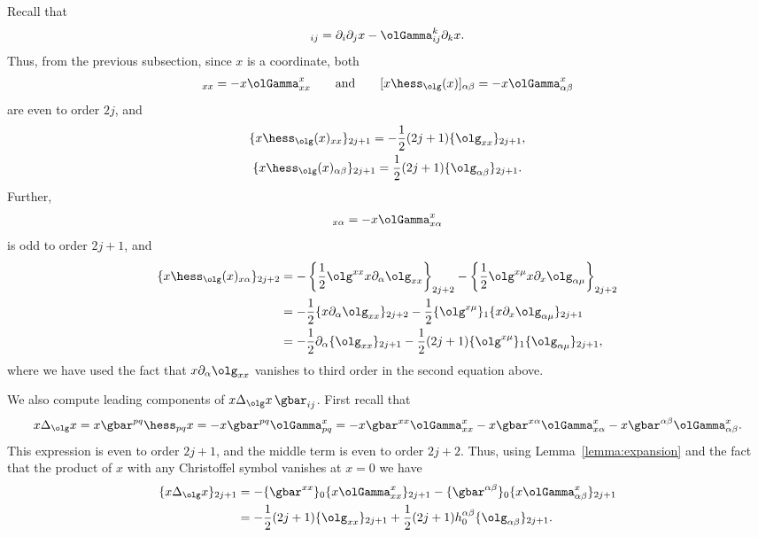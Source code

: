 Recall that
\begin{gather*}
 [\hess_{\olg} x]_{ij} = \partial_i \partial_j x - \olGamma_{ij}^k \partial_k x. \end{gather*}
Thus, from the previous subsection, since $x$ is a coordinate, both
\begin{gather*} [x \hess_{\olg}(x)]_{xx} = - x \olGamma_{xx}^x \qquad \mbox{and} \qquad [x \hess_{\olg}(x)]_{\alpha \beta} = - x \olGamma_{\alpha \beta}^x
\end{gather*}
are even to order $2j$, and
\begin{gather} \label{eqn:hess-asymp-xx}
\{x \hess_{\olg}(x)_{xx}\}_{2j+1} = -\frac{1}{2} (2j+1) \{\olg_{xx}\}_{2j+1}, \\
\{x \hess_{\olg}(x)_{\alpha \beta}\}_{2j+1} = \frac{1}{2} (2j+1) \{\olg_{\alpha \beta}\}_{2j+1}.\label{eqn:hess-asymp-ab}
\end{gather}
Further,
\begin{gather*}
 [x \hess_{\olg}(x)]_{x\alpha} = -x \olGamma_{x\alpha}^x
\end{gather*}
is odd to order $2j+1$, and
\begin{align}
 \{x \hess_{\olg}(x)_{x\alpha}\}_{2j+2} &= -\left\{\frac{1}{2}\olg^{xx} x \partial_{\alpha} \olg_{xx}\right\}_{2j+2} - \left\{ \frac{1}{2} \olg^{x\mu} x \partial_x \olg_{\alpha \mu} \right\}_{2j+2} \nonumber \\
 &= -\frac{1}{2} \{ x \partial_{\alpha} \olg_{xx} \}_{2j+2} - \frac{1}{2} \{ \olg^{x \mu} \}_1 \{ x \partial_x \olg_{\alpha \mu} \}_{2j+1} \nonumber \\
 &= -\frac{1}{2} \partial_{\alpha} \{\olg_{xx}\}_{2j+1} - \frac{1}{2}(2j+1)\{ \olg^{x \mu} \}_1 \{ \olg_{\alpha \mu}\}_{2j+1},\label{eqn:mixed-ref-1}
\end{align}
where we have used the fact that $x \partial_{\alpha} \olg_{xx}$ vanishes to third order in the second equation above.

We also compute leading components of $x \Delta_{\olg} x \, \gbar_{ij}$. First recall that
\begin{gather*}
x \Delta_{\olg} x = x \gbar^{pq} \hess_{pq} x =-x \gbar^{pq} \olGamma_{pq}^x = -x\gbar^{xx} \olGamma_{xx}^x - x\gbar^{x\alpha} \olGamma_{x\alpha}^x - x\gbar^{\alpha \beta} \olGamma_{\alpha \beta}^x.
\end{gather*}
This expression is even to order $2j+1$, and the middle term is even to order $2j+2$. Thus, using Lemma~\ref{lemma:expansion} and the fact that the product of $x$ with any Christoffel symbol vanishes at $x=0$ we have
\begin{align*}
 \{x \Delta_{\olg} x\}_{2j+1} &= -\{ \gbar^{xx}\}_0 \{ x \olGamma_{xx}^x\}_{2j+1} - \{ \gbar^{\alpha \beta}\}_0 \{ x\olGamma_{\alpha \beta}^x\}_{2j+1} \\
 &= -\frac{1}{2} (2j+1) \{\olg_{xx}\}_{2j+1} +\frac{1}{2} (2j+1) h_0^{\alpha \beta}\{\olg_{\alpha \beta}\}_{2j+1}.
\end{align*}


